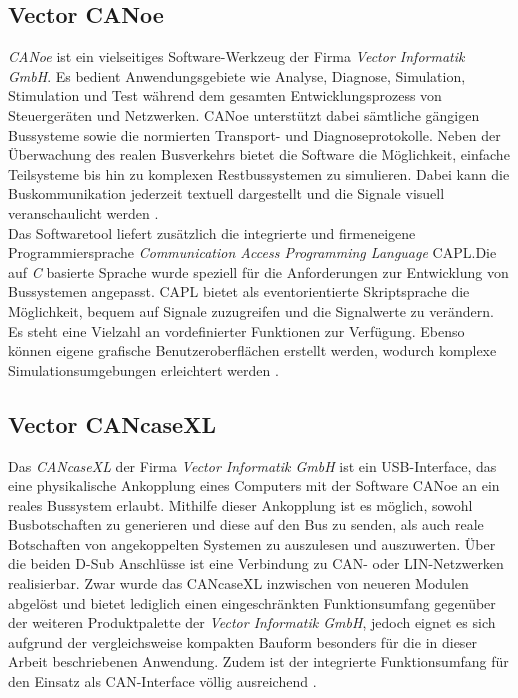 \subsection{Vector CANoe} \label{subsec:CANoe}
\emph{CANoe} ist ein vielseitiges Software-Werkzeug der Firma \emph{Vector Informatik GmbH}. Es bedient Anwendungsgebiete wie Analyse, Diagnose, Simulation, Stimulation und Test während dem gesamten Entwicklungsprozess von Steuergeräten und Netzwerken. CANoe unterstützt dabei sämtliche gängigen Bussysteme sowie die normierten Transport- und Diagnoseprotokolle. Neben der Überwachung des realen Busverkehrs bietet die Software die Möglichkeit, einfache Teilsysteme bis hin zu komplexen Restbussystemen zu simulieren. Dabei kann die Buskommunikation jederzeit textuell dargestellt und die Signale visuell veranschaulicht werden \cite{VectorInformatikGmbH.2018}.\\
Das Softwaretool liefert zusätzlich die integrierte und firmeneigene Programmiersprache \emph{Communication Access Programming Language} \acs{CAPL}.Die auf \emph{C} basierte Sprache wurde speziell für die Anforderungen zur Entwicklung von Bussystemen angepasst. \acs{CAPL} bietet als eventorientierte Skriptsprache die Möglichkeit, bequem auf Signale zuzugreifen und die Signalwerte zu verändern. Es steht eine Vielzahl an vordefinierter Funktionen zur Verfügung. Ebenso können eigene grafische Benutzeroberflächen erstellt werden, wodurch komplexe Simulationsumgebungen erleichtert werden \cite{VectorInformatikGmbH.07.08.2017}.

\subsection{Vector CANcaseXL} \label{subsec.CANcaseXL}
Das \emph{CANcaseXL} der Firma \emph{Vector Informatik GmbH} ist ein USB-Interface, das eine physikalische Ankopplung eines Computers mit der Software CANoe an ein reales Bussystem erlaubt. Mithilfe dieser Ankopplung ist es möglich, sowohl Busbotschaften zu generieren und diese auf den Bus zu senden, als auch reale Botschaften von angekoppelten Systemen zu auszulesen und auszuwerten. Über die beiden D-Sub Anschlüsse ist eine Verbindung zu \acs{CAN}- oder LIN-Netzwerken realisierbar. Zwar wurde das CANcaseXL inzwischen von neueren Modulen abgelöst und bietet lediglich einen eingeschränkten Funktionsumfang gegenüber der weiteren Produktpalette der \emph{Vector Informatik GmbH}, jedoch eignet es sich aufgrund der vergleichsweise kompakten Bauform besonders für die in dieser Arbeit beschriebenen Anwendung. Zudem ist der integrierte Funktionsumfang für den Einsatz als \acs{CAN}-Interface völlig ausreichend \cite{VectorInformatikGmbH.2015}.




